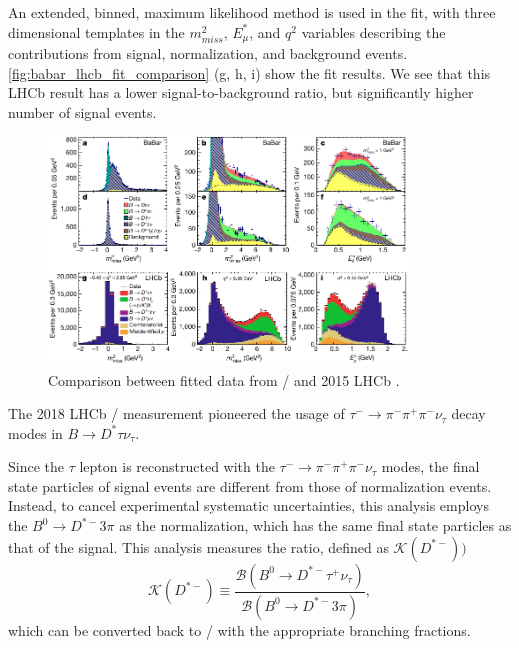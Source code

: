 An extended, binned, maximum likelihood method is used in the fit, with three
dimensional templates in the $m^2_{miss}$, $E^*_\mu$, and $q^2$ variables
describing the contributions from signal, normalization, and background events.
\autoref{fig:babar_lhcb_fit_comparison} (g, h, i) show the fit results.
We see that this LHCb result has a lower signal-to-background ratio, but
significantly higher number of signal events.

\begin{figure}[ht]
    \centering
    \includegraphics[width=0.85\textwidth]{figs/babar_lhcb_fit_comparison.pdf}
    \caption{
        Comparison between fitted data from \BaBar/ and 2015
        LHCb \cite{Ciezarek:2017yzh}.
    }
    \label{fig:babar_lhcb_fit_comparison}
\end{figure}

The 2018 LHCb \RDst/ measurement pioneered the usage of
$\tau^- \rightarrow \pi^- \pi^+ \pi^- \nu_\tau$
decay modes in $B \rightarrow D^{*} \tau \nu_\tau$.

Since the $\tau$ lepton is reconstructed with the
$\tau^- \rightarrow \pi^- \pi^+ \pi^- \nu_\tau$ modes, the final state particles
of signal events are different from those of normalization events.
Instead, to cancel experimental systematic uncertainties, this analysis employs
the $B^0 \rightarrow D^{*-} 3\pi$ as the normalization, which has the same final
state particles as that of the signal.
This analysis measures the ratio, defined as $\mathcal{K}(D^{*-}))$
\begin{equation}
    \mathcal{K}(D^{*-}) \equiv \frac{
        \mathcal{B}(B^0 \rightarrow D^{*-} \tau^+ \nu_\tau)
    }{
        \mathcal{B}(B^0 \rightarrow D^{*-} 3 \pi)
    },
\end{equation}
which can be converted back to \RDst/ with the appropriate branching fractions.

